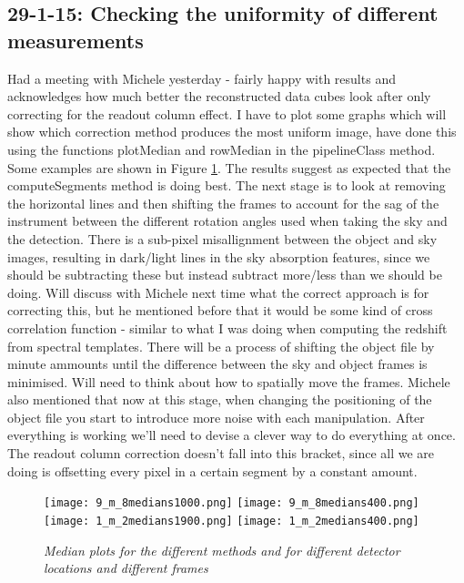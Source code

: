 \documentclass{literature}
\begin{document}
\subsection{29-1-15: Checking the uniformity of different measurements}
Had a meeting with Michele yesterday - fairly happy with results and acknowledges how much better the reconstructed data cubes look after only correcting for the readout column effect. I have to plot some graphs which will show which correction method produces the most uniform image, have done this using the functions plotMedian and rowMedian in the pipelineClass method. Some examples are shown in Figure \ref{fig:medians_plot}. The results suggest as expected that the computeSegments method is doing best. The next stage is to look at removing the horizontal lines and then shifting the frames to account for the sag of the instrument between the different rotation angles used when taking the sky and the detection. There is a sub-pixel misallignment between the object and sky images, resulting in dark/light lines in the sky absorption features, since we should be subtracting these but instead subtract more/less than we should be doing. Will discuss with Michele next time what the correct approach is for correcting this, but he mentioned before that it would be some kind of cross correlation function - similar to what I was doing when computing the redshift from spectral templates. There will be a process of shifting the object file by minute ammounts until the difference between the sky and object frames is minimised. Will need to think about how to spatially move the frames. Michele also mentioned that now at this stage, when changing the positioning of the object file you start to introduce more noise with each manipulation. After everything is working we'll need to devise a clever way to do everything at once. The readout column correction doesn't fall into this bracket, since all we are doing is offsetting every pixel in a certain segment by a constant amount.  

\begin{figure}[!htp]
\centering
\texttt{[image: 9\_m\_8medians1000.png]}
\texttt{[image: 9\_m\_8medians400.png]}
\texttt{[image: 1\_m\_2medians1900.png]}
\texttt{[image: 1\_m\_2medians400.png]}
\caption{\footnotesize{\emph{Median plots for the different methods and for different detector locations and different frames}}}
\label{fig:medians_plot}
\end{figure} 
\end{document}
